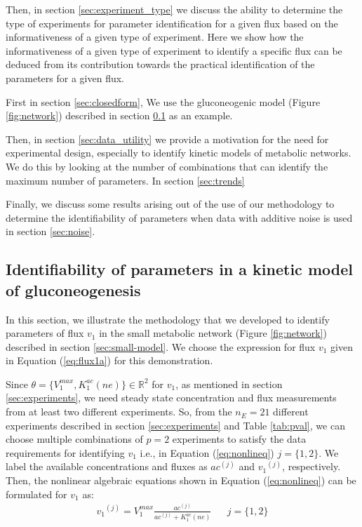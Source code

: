 \documentclass[10pt]{article}
\begin{document}
	Then, in section \ref{sec:experiment_type} we discuss the ability to determine the type of experiments for parameter identification for a given flux based on the informativeness of a given type of experiment. Here we show how the informativeness of a given type of experiment to identify a specific flux can be deduced from its contribution towards the practical identification of the parameters for a given flux. 
	
	First in section \ref{sec:closedform},  We use the gluconeogenic model (Figure \ref{fig:network}) described in section \ref{sec:example} as an example. 
	
	
	Then, in section \ref{sec:data_utility} we provide a motivation for the need for experimental design, especially to identify kinetic models of metabolic networks. We do this by looking at the number of combinations that can identify the maximum number of parameters. 
	In section \ref{sec:trends} 
	
Finally, we discuss some results arising out of the use of our methodology to determine the identifiability of parameters when data with additive noise is used in section \ref{sec:noise}.
	
	\subsection{Identifiability of parameters in a kinetic model of gluconeogenesis}\label{sec:example}	
	In this section, we illustrate the methodology that we developed to identify parameters of flux $v_1$ in the small metabolic network (Figure \ref{fig:network}) described in section \ref{sec:small-model}. We choose the expression for flux $v_1$ given in Equation (\ref{eq:flux1a}) for this demonstration. 
	
	Since $\theta = \{V_1^{max}, K_1^{ac} (ne)\} \in \mathbb{R}^2$ for $v_1$, as mentioned in section \ref{sec:experiments}, we need steady state concentration and flux measurements from at least two different experiments. So, from the $n_E = 21$ different experiments described in section \ref{sec:experiments} and Table \ref{tab:pval}, we can choose multiple combinations of $p = 2$ experiments to satisfy the data requirements for identifying $v_1$ i.e., in Equation (\ref{eq:nonlineq}) $j = \{1, 2\}$. We label the available concentrations and fluxes as ${ac}^{(j)}$ and ${v_1}^{(j)}$, respectively. Then, the nonlinear algebraic equations shown in Equation (\ref{eq:nonlineq}) can be formulated for $v_1$ as:
	\begin{align*}%
	{v_1}^{(j)} = V_{1}^{max}\frac{ac^{(j)}}{ac^{(j)}+K_{1}^{ac}(ne)} &&  j=\{1, 2\}
	\end{align*}
	
\end{document}
